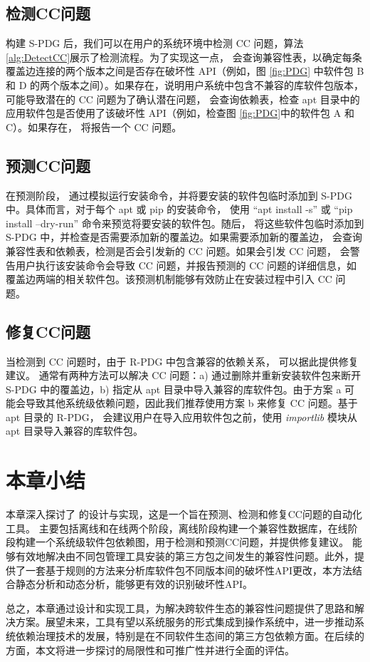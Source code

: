 \subsection{检测CC问题}\label{4.2.2}
构建 S-PDG 后，我们可以在用户的系统环境中检测 CC 问题，算法\ref{alg:DetectCC}展示了检测流程。为了实现这一点，\tool{} 会查询兼容性表，以确定每条覆盖边连接的两个版本之间是否存在破坏性 API（例如，图 \ref{fig:PDG} 中软件包 B 和 D 的两个版本之间）。如果存在，说明用户系统中包含不兼容的库软件包版本，可能导致潜在的 CC 问题为了确认潜在问题，\tool{} 会查询依赖表，检查 apt 目录中的应用软件包是否使用了该破坏性 API（例如，检查图 \ref{fig:PDG}中的软件包 A 和 C）。如果存在，\tool{} 将报告一个 CC 问题。


\subsection{预测CC问题}\label{4.2.3}
在预测阶段，\tool{} 通过模拟运行安装命令，并将要安装的软件包临时添加到 S-PDG 中。具体而言，对于每个 apt 或 pip 的安装命令，\tool{} 使用 “apt install -s” 或 “pip install --dry-run” 命令来预览将要安装的软件包。随后，\tool{} 将这些软件包临时添加到 S-PDG 中，并检查是否需要添加新的覆盖边。如果需要添加新的覆盖边，\tool{} 会查询兼容性表和依赖表，检测是否会引发新的 CC 问题。如果会引发 CC 问题，\tool{} 会警告用户执行该安装命令会导致 CC 问题，并报告预测的 CC 问题的详细信息，如覆盖边两端的相关软件包。该预测机制能够有效防止在安装过程中引入 CC 问题。

\subsection{修复CC问题}\label{4.2.4}
当检测到 CC 问题时，由于 R-PDG 中包含兼容的依赖关系，\tool{} 可以据此提供修复建议。
通常有两种方法可以解决 CC 问题：a) 通过删除并重新安装软件包来断开 S-PDG 中的覆盖边，b) 指定从 apt 目录中导入兼容的库软件包。由于方案 a 可能会导致其他系统级依赖问题，因此我们推荐使用方案 b 来修复 CC 问题。基于 apt 目录的 R-PDG，\tool{} 会建议用户在导入应用软件包之前，使用 \textit{importlib} 模块从 apt 目录导入兼容的库软件包。

\section{本章小结}
本章深入探讨了 \tool{}的设计与实现，这是一个旨在预测、检测和修复CC问题的自动化工具。 \tool{}主要包括离线和在线两个阶段，离线阶段构建一个兼容性数据库，在线阶段构建一个系统级软件包依赖图，用于检测和预测CC问题，并提供修复建议。\tool{} 能够有效地解决由不同包管理工具安装的第三方包之间发生的兼容性问题。此外，\tool{}提供了一套基于规则的方法来分析库软件包不同版本间的破坏性API更改，本方法结合静态分析和动态分析，能够更有效的识别破坏性API。

总之，本章通过设计和实现\tool{}工具，为解决跨软件生态的兼容性问题提供了思路和解决方案。展望未来，\tool{}工具有望以系统服务的形式集成到操作系统中，进一步推动系统依赖治理技术的发展，特别是在不同软件生态间的第三方包依赖方面。在后续的方面，本文将进一步探讨\tool{}的局限性和可推广性并进行全面的评估。